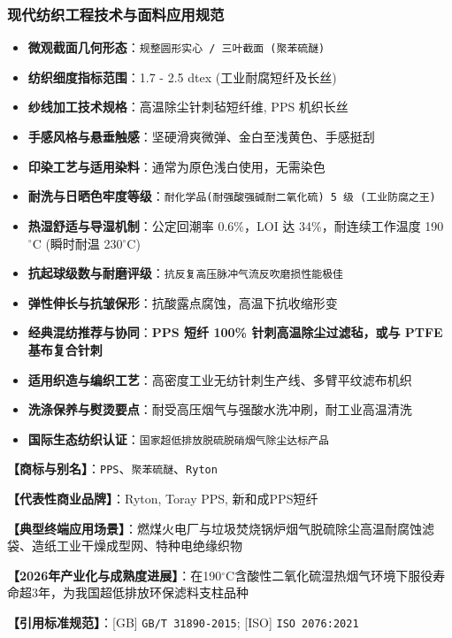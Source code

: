 \documentclass[11pt,openright,twoside,UTF8]{ctexbook}
\begin{document}
\subsubsection*{现代纺织工程技术与面料应用规范}
\begin{itemize} \setlength{\itemsep}{2pt}
    \item \textbf{微观截面几何形态}：\texttt{规整圆形实心 / 三叶截面 (聚苯硫醚)}
    \item \textbf{纺织细度指标范围}：1.7 - 2.5 dtex (工业耐腐短纤及长丝)
    \item \textbf{纱线加工技术规格}：高温除尘针刺毡短纤维, PPS 机织长丝
    \item \textbf{手感风格与悬垂触感}：坚硬滑爽微弹、金白至浅黄色、手感挺刮
    \item \textbf{印染工艺与适用染料}：通常为原色浅白使用，无需染色
    \item \textbf{耐洗与日晒色牢度等级}：\texttt{耐化学品(耐强酸强碱耐二氧化硫) 5 级 (工业防腐之王)}
    \item \textbf{热湿舒适与导湿机制}：公定回潮率 0.6\%，LOI 达 34\%，耐连续工作温度 190$^\circ\mathrm{C}$ (瞬时耐温 230$^\circ\mathrm{C}$)
    \item \textbf{抗起球级数与耐磨评级}：\texttt{抗反复高压脉冲气流反吹磨损性能极佳}
    \item \textbf{弹性伸长与抗皱保形}：抗酸露点腐蚀，高温下抗收缩形变
    \item \textbf{经典混纺推荐与协同}：\textbf{PPS 短纤 100\% 针刺高温除尘过滤毡，或与 PTFE 基布复合针刺}
    \item \textbf{适用织造与编织工艺}：高密度工业无纺针刺生产线、多臂平纹滤布机织
    \item \textbf{洗涤保养与熨烫要点}：耐受高压烟气与强酸水洗冲刷，耐工业高温清洗
    \item \textbf{国际生态纺织认证}：\texttt{国家超低排放脱硫脱硝烟气除尘达标产品}
\end{itemize}
\vspace{0.2cm}

\noindent\textbf{【商标与别名】}：\texttt{PPS}、\texttt{聚苯硫醚}、\texttt{Ryton}\par
\noindent\textbf{【代表性商业品牌】}：Ryton, Toray PPS, 新和成PPS短纤\par
\noindent\textbf{【典型终端应用场景】}：燃煤火电厂与垃圾焚烧锅炉烟气脱硫除尘高温耐腐蚀滤袋、造纸工业干燥成型网、特种电绝缘织物\par
\noindent\textbf{【2026年产业化与成熟度进展】}：在190$^\circ\mathrm{C}$含酸性二氧化硫湿热烟气环境下服役寿命超3年，为我国超低排放环保滤料支柱品种\par
\noindent\textbf{【引用标准规范】}：[GB] \texttt{GB/T 31890-2015}; [ISO] \texttt{ISO 2076:2021}\par
\vspace{0.5cm}
\end{document}
